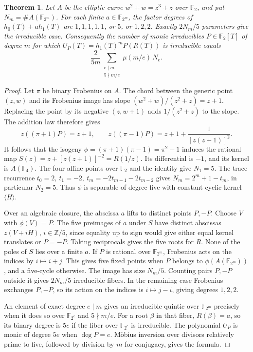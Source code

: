 \documentclass[11pt]{article}
\newtheorem{theorem}{Theorem}
\newcommand{\F}{\mathbb F_2}
\begin{document}
\begin{theorem}
Let \(A\) be the elliptic curve \(w^2+w=z^3+z\) over \(\F\),
and put \(N_m=\#A(\mathbb F_{2^m})\). For each finite
\(a\in\mathbb F_{2^m}\), the factor degrees of \(h_0(T)+a h_1(T)\)
are \(1,1,1,1,1\), or \(5\), or \(1,2,2\). Exactly \(2N_m/5\)
parameters give the irreducible case. Consequently the number of
monic irreducibles \(P\in\F[T]\) of degree \(m\) for which
\(U_P(T)=h_1(T)^m P(R(T))\) is irreducible equals
\[
  \frac{2}{5m}\sum_{\substack{e\mid m\\5\nmid m/e}}\mu(m/e)\,N_e .
\]
\end{theorem}
\begin{proof}
Let \(\pi\) be binary Frobenius on \(A\). The chord between the generic
point \((z,w)\) and its Frobenius image has slope
\((w^2+w)/(z^2+z)=z+1\). Replacing the point by its negative
\((z,w+1)\) adds \(1/(z^2+z)\) to the slope. The addition law therefore gives
\[
 z((\pi+1)P)=z+1,\qquad
 z((\pi-1)P)=z+1+\frac{1}{[z(z+1)]^2}.
\]
It follows that the isogeny \(\phi=(\pi+1)(\pi-1)=\pi^2-1\) induces
the rational map \(S(z)=z+[z(z+1)]^{-2}=R(1/z)\).
Its differential is \(-1\), and its kernel is \(A(\mathbb F_4)\).
The four affine points over \(\F\) and the identity give \(N_1=5\).
The trace recurrence \(t_0=2,\ t_1=-2,\ t_m=-2t_{m-1}-2t_{m-2}\)
gives \(N_m=2^m+1-t_m\), in particular \(N_2=5\). Thus \(\phi\) is
separable of degree five with constant cyclic kernel \(\langle H\rangle\).

Over an algebraic closure, the abscissa \(a\) lifts to distinct points
\(P,-P\). Choose \(V\) with \(\phi(V)=P\). The five preimages of \(a\)
under \(S\) have distinct abscissas \(z(V+iH)\), \(i\in\mathbb Z/5\),
since equality up to sign would give either equal kernel translates or \(P=-P\).
Taking reciprocals gives the five roots for \(R\). None of the poles
of \(S\) lies over a finite \(a\). If \(P\) is rational over
\(\mathbb F_{2^m}\), Frobenius acts on the indices by
\(i\mapsto i+j\). This gives five fixed points when \(P\) belongs to
\(\phi(A(\mathbb F_{2^m}))\), and a five-cycle otherwise. The image has
size \(N_m/5\). Counting pairs \(P,-P\) outside it gives \(2N_m/5\)
irreducible fibers. In the remaining case Frobenius exchanges \(P,-P\),
so its action on the indices is \(i\mapsto j-i\), giving degrees \(1,2,2\).

An element of exact degree \(e\mid m\) gives an irreducible quintic over
\(\mathbb F_{2^m}\) precisely when it does so over \(\mathbb F_{2^e}\)
and \(5\nmid m/e\). For a root \(\beta\) in that fiber,
\(R(\beta)=a\), so its binary degree is \(5e\) if the fiber over
\(\mathbb F_{2^e}\) is irreducible. The polynomial \(U_P\) is monic of
degree \(5e\) when \(\deg P=e\). Möbius inversion over divisors
relatively prime to five, followed by division by \(m\) for conjugacy,
gives the formula.
\end{proof}
\end{document}
